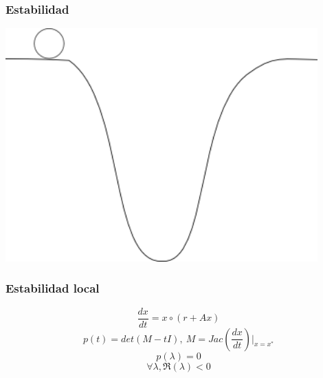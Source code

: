 \documentclass[11 pt,t]{beamer}
\begin{document}
\begin{frame}
  \frametitle{Estabilidad}
  \centering
  \includegraphics[width = 0.9\textwidth]{Pics/stability.png}
\end{frame}
\begin{frame}
  \frametitle{Estabilidad local}
  \begin{equation*}
    \frac{dx}{dt} = x \circ (r + A x)
  \end{equation*}
  \pause
  \begin{equation*}
    p(t) = det(M - tI) , \ M = Jac(\frac{dx}{dt})|_{x = x^*}
  \end{equation*}
  \pause
  \[p(\lambda) = 0 \]
  \pause
  \[\forall \lambda, \Re(\lambda) < 0 \]
    
\end{frame}
\end{document}
